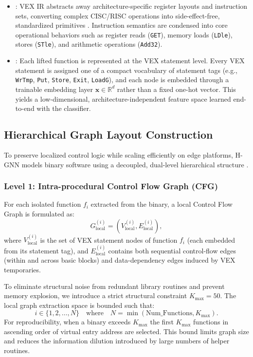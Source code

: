 \documentclass[conference]{IEEEtran}
\begin{document}
\begin{itemize}
    \item {}: VEX IR abstracts away architecture-specific register layouts and instruction sets, converting complex CISC/RISC operations into side-effect-free, standardized primitives \cite{b8}. Instruction semantics are condensed into core operational behaviors such as register reads (\texttt{GET}), memory loads (\texttt{LDle}), stores (\texttt{STle}), and arithmetic operations (\texttt{Add32}).
    \item {}: Each lifted function is represented at the VEX
statement level. Every VEX statement is assigned one of a compact vocabulary of
statement tags (e.g., \texttt{WrTmp}, \texttt{Put}, \texttt{Store}, \texttt{Exit}, \texttt{LoadG}),
and each node is embedded through a trainable embedding layer $\mathbf{x} \in \mathbb{R}^{d}$
rather than a fixed one-hot vector. This yields a low-dimensional, architecture-independent
feature space learned end-to-end with the classifier.
\end{itemize}

\subsection{Hierarchical Graph Layout Construction}
To preserve localized control logic while scaling efficiently on edge platforms, H-GNN models binary software using a decoupled, dual-level hierarchical structure \cite{b6}.

\subsubsection{Level 1: Intra-procedural Control Flow Graph (CFG)}
For each isolated function $f_i$ extracted from the binary, a local Control Flow Graph is formulated as:
\begin{equation}
G_{\text{local}}^{(i)} = (V_{\text{local}}^{(i)}, E_{\text{local}}^{(i)}),
\end{equation}
where $V_{\text{local}}^{(i)}$ is the set of VEX statement nodes of function $f_i$
(each embedded from its statement tag), and $E_{\text{local}}^{(i)}$ contains both sequential
control-flow edges (within and across basic blocks) and data-dependency edges induced by VEX
temporaries.

To eliminate structural noise from redundant library routines and prevent memory explosion, we introduce a strict structural constraint $K_{\text{max}} = 50$. The local graph extraction space is bounded such that:
\begin{equation}
i \in \{1, 2, \dots, N\} \quad \text{where} \quad N = \min(\text{Num\_Functions}, K_{\text{max}}).
\end{equation}
For reproducibility, when a binary exceeds $K_{\text{max}}$ the first $K_{\text{max}}$ functions in ascending order of virtual entry address are selected. This bound limits graph size and reduces the information dilution introduced by large numbers of helper routines.
\end{document}
